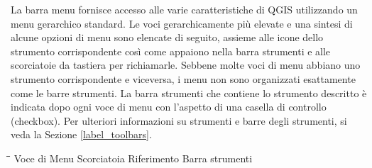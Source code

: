La barra menu fornisce accesso alle varie caratteristiche di QGIS utilizzando un menu
gerarchico standard. Le voci gerarchicamente più elevate e una sintesi di alcune opzioni
di menu sono elencate di seguito, assieme alle icone dello strumento corrispondente
così come appaiono nella barra strumenti e alle scorciatoie da tastiera per richiamarle.
Sebbene molte voci di menu abbiano uno strumento corrispondente e viceversa,
i menu non sono organizzati esattamente come le barre strumenti. 
La barra strumenti che contiene lo strumento descritto è indicata dopo ogni voce di menu
con l'aspetto di una casella di controllo (checkbox).
Per ulteriori informazioni su strumenti e barre degli strumenti, si veda la Sezione \ref{label_toolbars}.

\begin{tabbing}
\hspace{5.5cm}\=\hspace{3cm}\=\hspace{3.5cm}\= \kill
\hspace{1cm} Voce di Menu \> Scorciatoia \> Riferimento \> Barra strumenti\\
\end{tabbing}

